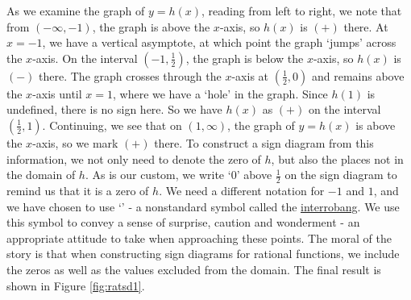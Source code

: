 

As we examine the graph of $y=h(x)$, reading from left to right, we note that from $(-\infty,-1)$, the graph is above the $x$-axis, so $h(x)$ is $(+)$ there.  At $x=-1$, we have a vertical asymptote, at which point the graph `jumps' across the $x$-axis.  On the interval $\left(-1,\frac{1}{2}\right)$, the graph is below the $x$-axis, so $h(x)$ is $(-)$ there.  The graph crosses through the $x$-axis at $\left(\frac{1}{2},0\right)$ and remains above the $x$-axis until $x=1$, where we have a `hole' in the graph.  Since $h(1)$ is undefined, there is no sign here.  So we have $h(x)$ as $(+)$ on the interval $\left(\frac{1}{2}, 1\right)$.  Continuing, we see that on $(1, \infty)$, the graph of $y=h(x)$ is above the $x$-axis, so we mark $(+)$ there.  To construct a sign diagram from this information, we not only need to denote the zero of $h$, but also the places not in the domain of $h$.  As is our custom, we write `$0$' above $\frac{1}{2}$ on the sign diagram to remind us that it is a zero of $h$.  We need a different notation for $-1$ and $1$, and we have chosen to use `\textinterrobang' - a nonstandard symbol called the \href{http://en.wikipedia.org/wiki/Interrobang}{\underline{interrobang}}.   We use this symbol to convey a sense of surprise, caution and wonderment - an appropriate attitude to take when approaching these points.   The moral of the story is that when constructing sign diagrams for rational functions, we include the zeros as well as the values excluded from the domain. The final result is shown in Figure \ref{fig:ratsd1}.




\medskip



